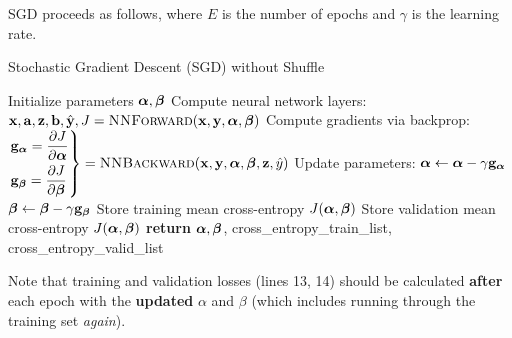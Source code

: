 SGD proceeds as follows, where $E$ is the number of epochs and $\gamma$ is the learning rate.


\begin{algorithm}[H]
  \caption{Stochastic Gradient Descent (SGD) without Shuffle}
  \label{alg:sgd}
  \begin{algorithmic}[1] %
      \State Initialize parameters $\boldsymbol \alpha, \boldsymbol \beta$ 
       
        \For{$(\xv, \yv) \in \Dc$} 
          \State Compute neural network layers:
          \State $\xv, \av, \zv, \bv, \hat{\yv}, J = \textproc{NNForward}(\xv, \yv, \alphav, \betav)$
          \State Compute gradients via backprop: 
          \State 
              $
                \begin{drcases}
                \gv_{\alphav} = \frac{\partial J}{\partial \alphav} \\
                \gv_{\betav} = \frac{\partial J}{\partial \betav}
                \end{drcases} 
                = \textproc{NNBackward}(\xv, \yv, \alphav, \betav, \zv, \hat{y})
              $
          \State Update parameters:
          \State $\boldsymbol \alpha \gets \boldsymbol \alpha - \gamma \mathbf{g}_{\boldsymbol \alpha}$
          \State $\boldsymbol \beta \gets \boldsymbol \beta - \gamma \mathbf{g}_{\boldsymbol \beta}$
        \EndFor
        \State Store training mean cross-entropy $J(\boldsymbol \alpha, \boldsymbol \beta)$ 
        \State Store validation mean cross-entropy $J(\boldsymbol \alpha, \boldsymbol \beta)$ 
      \EndFor
      \State \textbf{return} $\boldsymbol \alpha, \boldsymbol \beta$, cross\_entropy\_train\_list, cross\_entropy\_valid\_list
    \EndProcedure
  \end{algorithmic}
\end{algorithm}

Note that training and validation losses (lines 13, 14) should be calculated \textbf{after} each epoch with the \textbf{updated} $\alpha$ and $\beta$ (which includes running through the training set \textit{again}). 

